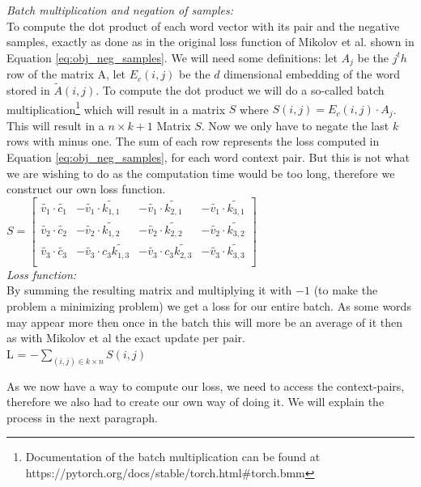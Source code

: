  \textit{Batch multiplication and negation of samples:}\\ 
 To compute the dot product of each word vector with its pair and the negative samples, exactly as done as in the original loss function of Mikolov et al. shown in Equation \ref{eq:obj_neg_samples}. We will need some definitions: let $A_j$ be the $j^th$ row of the matrix A, let $E_c(i,j)$ be the $d$ dimensional embedding of the word stored in $\tilde{A}(i,j)$. To compute the dot product we will do a so-called batch multiplication\footnote{Documentation of the batch multiplication  can be found at https://pytorch.org/docs/stable/torch.html\#torch.bmm} which will result in a matrix $S$ where $S(i,j) = E_c(i,j) \cdot A_j$. This will result in a $n\times k+1$ Matrix $S$. Now we only have to negate the last $k$ rows with minus one. The sum of each row represents the loss computed in Equation \ref{eq:obj_neg_samples}, for each word context pair.
  But this is not what we are wishing to do as the computation time would be too long, therefore we construct our own loss function. \\
  $S = \begin{bmatrix}
\tilde{v_1} \cdot  \tilde{c_1} & -\tilde{v_1} \cdot \tilde{k_{1,1}} & -\tilde{v_1} \cdot  \tilde{k_{2,1}}& -\tilde{v_1} \cdot  \tilde{k_{3,1}}\\
\tilde{v_2} \cdot \tilde{c_2} & -\tilde{v_2} \cdot \tilde{k_{1,2}} & -\tilde{v_2} \cdot \tilde{k_{2,2}} & -\tilde{v_2} \cdot \tilde{k_{3,2}}\\
\tilde{v_3} \cdot \tilde{c_3} &-\tilde{v_3} \cdot c_3  \tilde{k_{1,3}} & -\tilde{v_3} \cdot c_3 \tilde{k_{2,3}}&-\tilde{v_3} \cdot \tilde{k_{3,3}}\\
\end{bmatrix}$\\

\textit{Loss function:}\\
By summing the resulting matrix and multiplying it with $-1$ (to make the problem a minimizing problem) we get a loss for our entire batch. As some words may appear more then once in the batch this will more be an average of it then as with Mikolov et al the exact update per pair. \\
 L = $- \sum_{(i,j) \in k \times n} S(i,j) $

 
As we now have a way to compute our loss, we need to access the context-pairs, therefore we also had to create our own way of doing it. We will explain the process in the next paragraph.


